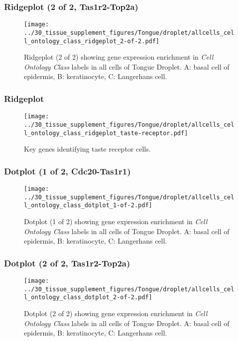 \clearpage

\subsubsection{Ridgeplot (2 of 2, Tas1r2-Top2a)}
\begin{figure}[h]
\centering
\texttt{[image: ../30\_tissue\_supplement\_figures/Tongue/droplet/allcells\_cell\_ontology\_class\_ridgeplot\_2-of-2.pdf]}

\caption{ Ridgeplot (2 of 2)  showing gene expression enrichment in \emph{Cell Ontology Class} labels in all cells of Tongue Droplet. A: basal cell of epidermis, B: keratinocyte, C: Langerhans cell.}
\end{figure}


\clearpage

\subsubsection{Ridgeplot}
\begin{figure}[h]
\centering
\texttt{[image: ../30\_tissue\_supplement\_figures/Tongue/droplet/allcells\_cell\_ontology\_class\_ridgeplot\_taste-receptor.pdf]}

\caption{Key genes identifying taste receptor cells.
}
\end{figure}


\clearpage

\subsubsection{Dotplot (1 of 2, Cdc20-Tas1r1)}
\begin{figure}[h]
\centering
\texttt{[image: ../30\_tissue\_supplement\_figures/Tongue/droplet/allcells\_cell\_ontology\_class\_dotplot\_1-of-2.pdf]}

\caption{ Dotplot (1 of 2)  showing gene expression enrichment in \emph{Cell Ontology Class} labels in all cells of Tongue Droplet. A: basal cell of epidermis, B: keratinocyte, C: Langerhans cell.}
\end{figure}


\clearpage

\subsubsection{Dotplot (2 of 2, Tas1r2-Top2a)}
\begin{figure}[h]
\centering
\texttt{[image: ../30\_tissue\_supplement\_figures/Tongue/droplet/allcells\_cell\_ontology\_class\_dotplot\_2-of-2.pdf]}

\caption{ Dotplot (2 of 2)  showing gene expression enrichment in \emph{Cell Ontology Class} labels in all cells of Tongue Droplet. A: basal cell of epidermis, B: keratinocyte, C: Langerhans cell.}
\end{figure}


